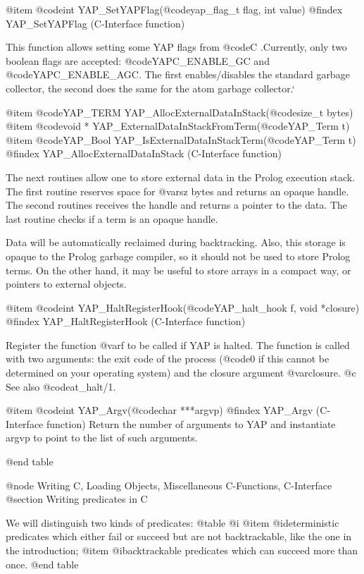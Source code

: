 {{{{{{{{{@item  @code{int} YAP_SetYAPFlag(@code{yap_flag_t flag, int value})
@findex YAP_SetYAPFlag (C-Interface function)

This function allows setting some YAP flags from @code{C} .Currently,
only two boolean flags are accepted: @code{YAPC_ENABLE_GC} and
@code{YAPC_ENABLE_AGC}.  The first enables/disables the standard garbage
collector, the second does the same for the atom garbage collector.`

@item  @code{YAP_TERM} YAP_AllocExternalDataInStack(@code{size_t bytes})
@item  @code{void *} YAP_ExternalDataInStackFromTerm(@code{YAP_Term t})
@item  @code{YAP_Bool} YAP_IsExternalDataInStackTerm(@code{YAP_Term t})
@findex YAP_AllocExternalDataInStack (C-Interface function)

The next routines allow one to store external data in the Prolog
execution stack. The first routine reserves space for @var{sz} bytes
and returns an opaque handle. The second routines receives the handle
and returns a pointer to the data.  The last routine checks if a term
is an opaque handle.

Data will be automatically reclaimed during
backtracking. Also, this storage is opaque to the Prolog garbage compiler,
so it should not be used to store Prolog terms. On the other hand, it
may be useful to store arrays in a compact way, or pointers to external objects.

@item  @code{int} YAP_HaltRegisterHook(@code{YAP_halt_hook f, void *closure})
@findex YAP_HaltRegisterHook (C-Interface function)

Register the function @var{f} to be called if YAP is halted. The
function is called with two arguments: the exit code of the process
(@code{0} if this cannot be determined on your operating system) and
the closure argument @var{closure}.
@c See also @code{at_halt/1}.

@item  @code{int} YAP_Argv(@code{char ***argvp})
@findex YAP_Argv (C-Interface function)
Return the number of arguments to YAP and instantiate argvp to point to the list of such arguments.

@end table


@node Writing C, Loading Objects, Miscellaneous C-Functions, C-Interface
@section Writing predicates in C

We will distinguish two kinds of predicates:
@table @i
@item @i{deterministic} predicates which either fail or succeed but are not
backtrackable, like the one in the introduction;
@item @i{backtrackable}
predicates which can succeed more than once.
@end table

}}}}}}}}}

